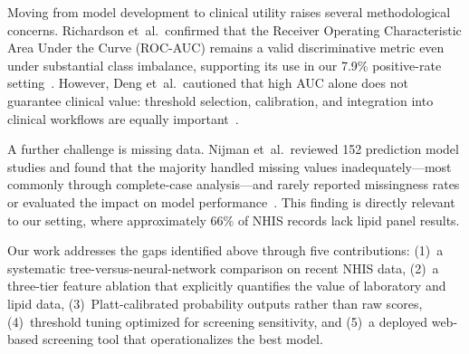 Moving from model development to clinical utility raises several methodological concerns.  Richardson et~al.\ confirmed that the Receiver Operating Characteristic Area Under the Curve (ROC-AUC) remains a valid discriminative metric even under substantial class imbalance, supporting its use in our 7.9\% positive-rate setting~\cite{Richardson2024roc}.  However, Deng et~al.\ cautioned that high AUC alone does not guarantee clinical value: threshold selection, calibration, and integration into clinical workflows are equally important~\cite{Deng2025highauc}.

A further challenge is missing data.  Nijman et~al.\ reviewed 152 prediction model studies and found that the majority handled missing values inadequately---most commonly through complete-case analysis---and rarely reported missingness rates or evaluated the impact on model performance~\cite{Nijman2022missingdata}.  This finding is directly relevant to our setting, where approximately 66\% of NHIS records lack lipid panel results.

Our work addresses the gaps identified above through five contributions: (1)~a systematic tree-versus-neural-network comparison on recent NHIS data, (2)~a three-tier feature ablation that explicitly quantifies the value of laboratory and lipid data, (3)~Platt-calibrated probability outputs rather than raw scores, (4)~threshold tuning optimized for screening sensitivity, and (5)~a deployed web-based screening tool that operationalizes the best model.
